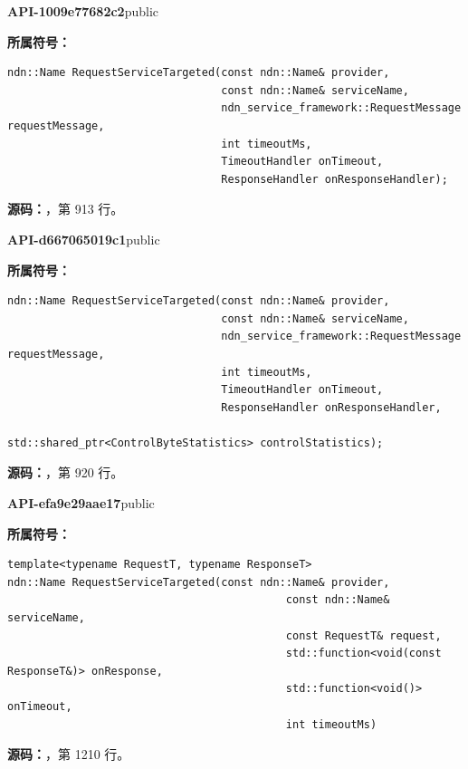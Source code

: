 \textbf{API-1009e77682c2}\quad public\par
\textbf{所属符号：}\par
\begin{Verbatim}[fontsize=\footnotesize,breaklines,breakanywhere]
ndn::Name RequestServiceTargeted(const ndn::Name& provider,
                                 const ndn::Name& serviceName,
                                 ndn_service_framework::RequestMessage requestMessage,
                                 int timeoutMs,
                                 TimeoutHandler onTimeout,
                                 ResponseHandler onResponseHandler);
\end{Verbatim}
\textbf{源码：}，第 913 行。\par

\textbf{API-d667065019c1}\quad public\par
\textbf{所属符号：}\par
\begin{Verbatim}[fontsize=\footnotesize,breaklines,breakanywhere]
ndn::Name RequestServiceTargeted(const ndn::Name& provider,
                                 const ndn::Name& serviceName,
                                 ndn_service_framework::RequestMessage requestMessage,
                                 int timeoutMs,
                                 TimeoutHandler onTimeout,
                                 ResponseHandler onResponseHandler,
                                 std::shared_ptr<ControlByteStatistics> controlStatistics);
\end{Verbatim}
\textbf{源码：}，第 920 行。\par

\textbf{API-efa9e29aae17}\quad public\par
\textbf{所属符号：}\par
\begin{Verbatim}[fontsize=\footnotesize,breaklines,breakanywhere]
template<typename RequestT, typename ResponseT>
ndn::Name RequestServiceTargeted(const ndn::Name& provider,
                                           const ndn::Name& serviceName,
                                           const RequestT& request,
                                           std::function<void(const ResponseT&)> onResponse,
                                           std::function<void()> onTimeout,
                                           int timeoutMs)
\end{Verbatim}
\textbf{源码：}，第 1210 行。\par

